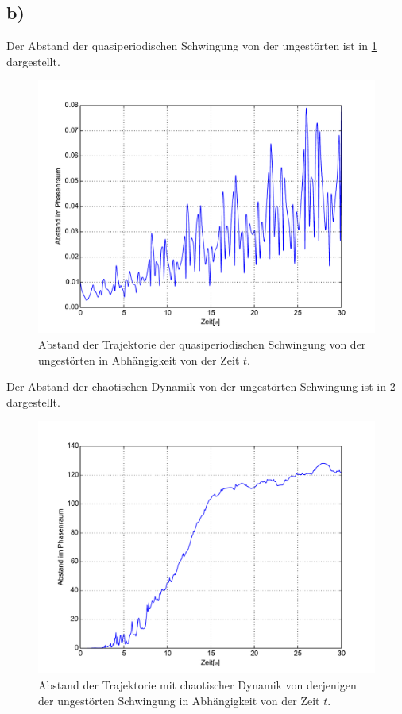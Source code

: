\subsection*{b)}
Der Abstand der quasiperiodischen Schwingung von der ungestörten ist in \cref{fig:abstand1} dargestellt.
\begin{figure}[H]
	\includegraphics[width = \textwidth]{../Plots/Plot_2_B_1.pdf}
	\caption{Abstand der Trajektorie der quasiperiodischen Schwingung von der ungestörten in Abhängigkeit von der Zeit $t$.\label{fig:abstand1}}
\end{figure}
Der Abstand der chaotischen Dynamik von der ungestörten Schwingung ist in \cref{fig:abstand2} dargestellt.
\begin{figure}[H]
	\includegraphics[width = \textwidth]{../Plots/Plot_2_B_2.pdf}
	\caption{Abstand der Trajektorie mit chaotischer Dynamik von derjenigen der ungestörten Schwingung in Abhängigkeit von der Zeit $t$.\label{fig:abstand2}}
\end{figure}

